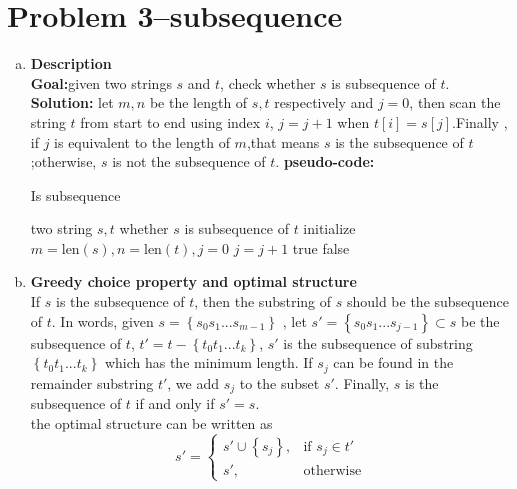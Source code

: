 \section{Problem 3--subsequence}
\begin{enumerate}[a).]
	\item \textbf{Description}	\\
	\textbf{Goal:}\qquad given two strings $s$ and $t$, check whether $s$ is subsequence of $t$. \\
	\textbf{Solution:}  let $m,n$ be the length of $s,t$ respectively and $j = 0$,
	then scan the string $t$ from start to end using index $i$, 	 
	$j = j + 1$ when $t[i] = s[j]$.Finally , if $j$ is equivalent to the length of $m$,that means
	$s$ is the subsequence of $t$;otherwise, $s$ is not the subsequence of $t$.
	\textbf{pseudo-code:} 
	\begin{algorithm}[H]
		\caption{Is subsequence}
		\begin{algorithmic}[1]
			\Require\quad two string $s,t$
			\Ensure  whether $s$ is subsequence of $t$	
			\State initialize $m = \text{len}(s), n = \text{len}(t), j = 0$
			\State $j = j +1 $
			\EndIf 
			\EndFor 
			\State \Return true
			\Else
			\State \Return false
			\EndIf 				 
			\EndFunction 
		\end{algorithmic} 
	\end{algorithm}
	\item \textbf{Greedy choice property and optimal structure} \\
	If $s$ is the subsequence of $t$, then the substring of $s$ should be the subsequence of $t$.	
	In words, given $s = \left\lbrace s_0s_1...s_{m-1}\right\rbrace$ , 
	let $s' = \left\lbrace {s_0 s_1 ... s_{j-1}}\right\rbrace \subset s$ be the subsequence of $t$, 
	$t' = t - \left\lbrace{t_0 t_1 ... t_k}\right\rbrace $, $s'$ is the subsequence of substring 
	$\left\lbrace{t_0 t_1 ... t_k}\right\rbrace$ which has 
	the minimum length.
	If $s_{j}$ can be found in the remainder substring $t'$,
	we add $s_{j}$ to the subset $s'$.
	Finally,  $s$ is the subsequence of $t$ if and only if $s' = s$. \\
	the optimal structure can be written as 
	\[
	s' = \left\lbrace \begin{split}
	s'\cup {\left\lbrace s_j \right\rbrace} , &\text{if } s_j \in t' \\
	s', &\text{otherwise} 
	\end{split} 
	\right.  
\]
\end{enumerate}
